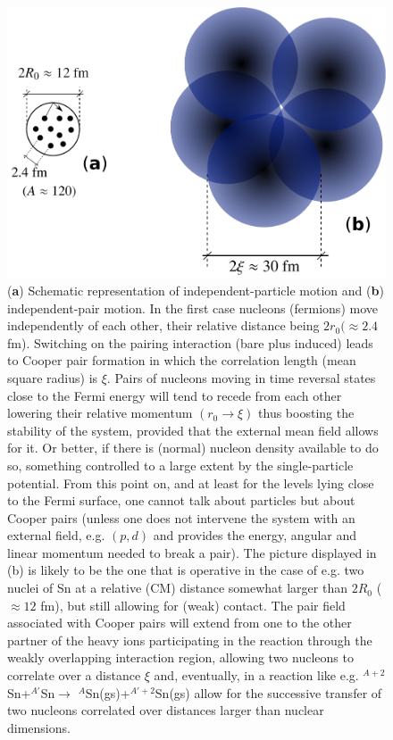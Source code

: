 \begin{figure}
\centerline{\includegraphics*[width=14cm,angle=0]{nutshell/figs/fig3_1_4.pdf}}
\caption{(\textbf{a}) Schematic representation of independent-particle motion and (\textbf{b}) independent-pair motion. In the first case nucleons (fermions) move independently of each other, their relative distance being $2r_0(\approx 2.4$ fm).  Switching on the pairing interaction (bare plus induced) leads to Cooper pair formation in which the correlation length (mean square radius) is $\xi$. Pairs of nucleons moving in time reversal states close to the Fermi energy will tend to recede from each other lowering their relative momentum $(r_0\rightarrow \xi)$ thus boosting the stability of the system, provided that the external mean field allows for it. Or better, if  there is (normal) nucleon density available to do so, something controlled to a large extent by the single-particle potential. From this point on, and at least for the levels lying close to the Fermi surface, one cannot talk about particles but about Cooper pairs (unless one does not intervene the system with an external field, e.g. $(p,d)$ and provides the energy, angular and linear momentum needed to break a pair). The picture displayed in (b) is likely to be the one that is operative in the case of e.g. two nuclei of  Sn at a relative (CM) distance somewhat larger than $2R_0$ ($\approx 12$ fm), but still allowing for  (weak) contact. The pair field associated with  Cooper pairs will extend from one to the other partner of the heavy ions participating in the reaction through the weakly overlapping interaction region, allowing two nucleons to correlate over a distance $\xi$ and, eventually, in a reaction like e.g. $^{A+2}$Sn+$^{A'}$Sn$\rightarrow$ $^{A}$Sn(gs)+$^{A'+2}$Sn(gs) allow for the successive transfer of two nucleons correlated over distances larger than nuclear dimensions.}\label{fig3.2.1}
\end{figure}
